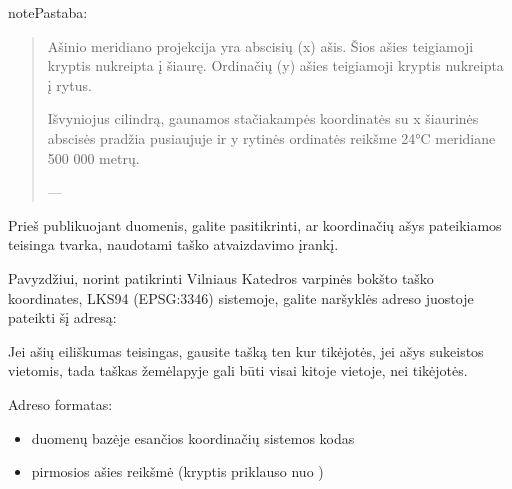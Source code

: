 \documentclass[letterpaper,10pt,lithuanian]{sphinxmanual}
\begin{document}
\begin{fulllineitems}
\begin{sphinxadmonition}{note}{Pastaba:}
\begin{quote}
\sphinxAtStartPar
Ašinio meridiano projekcija yra abscisių (x) ašis. Šios ašies
teigiamoji kryptis nukreipta į šiaurę. Ordinačių (y) ašies
teigiamoji kryptis nukreipta į rytus.

\sphinxAtStartPar
Išvyniojus cilindrą, gaunamos stačiakampės koordinatės su x
šiaurinės abscisės pradžia pusiaujuje ir y rytinės ordinatės
reikšme 24°C meridiane 500 000 metrų.

\begin{flushright}
---
\end{flushright}
\end{quote}
\end{sphinxadmonition}

\sphinxAtStartPar
Prieš publikuojant duomenis, galite pasitikrinti, ar koordinačių ašys
pateikiamos teisinga tvarka, naudotami taško atvaizdavimo įrankį.

\sphinxAtStartPar
Pavyzdžiui, norint patikrinti Vilniaus Katedros varpinės bokšto taško
koordinates, LKS94 (EPSG:3346) sistemoje, galite naršyklės adreso juostoje
pateikti šį adresą:

\sphinxAtStartPar
{}

\sphinxAtStartPar
Jei ašių eiliškumas teisingas, gausite tašką ten kur tikėjotės, jei ašys
sukeistos vietomis, tada taškas žemėlapyje gali būti visai kitoje vietoje,
nei tikėjotės.

\sphinxAtStartPar
Adreso formatas:

\begin{sphinxVerbatim}[commandchars=\\\{\}]
\end{sphinxVerbatim}
\begin{itemize}
\item {} 
\sphinxAtStartPar
{} \sphinxhyphen{}  duomenų bazėje esančios koordinačių sistemos  kodas

\item {} 
\sphinxAtStartPar
{} \sphinxhyphen{} pirmosios ašies reikšmė (kryptis priklauso nuo )


\end{itemize}
\end{fulllineitems}
\end{document}
